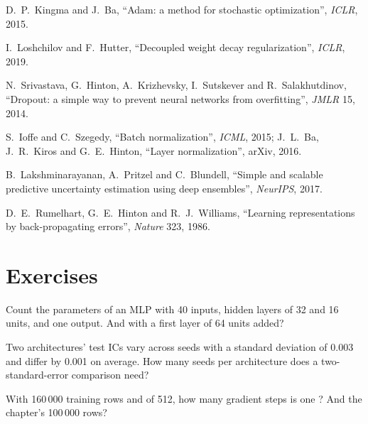 \begin{omsources}
\item D.~P.~Kingma and J.~Ba, ``Adam: a method for stochastic optimization'', \emph{ICLR}, 2015.
\item I.~Loshchilov and F.~Hutter, ``Decoupled weight decay regularization'', \emph{ICLR}, 2019.
\item N.~Srivastava, G.~Hinton, A.~Krizhevsky, I.~Sutskever and R.~Salakhutdinov, ``Dropout: a simple way to prevent
neural networks from overfitting'', \emph{JMLR} 15, 2014.
\item S.~Ioffe and C.~Szegedy, ``Batch normalization'', \emph{ICML}, 2015; J.~L.~Ba, J.~R.~Kiros and G.~E.~Hinton,
``Layer normalization'', arXiv, 2016.
\item B.~Lakshminarayanan, A.~Pritzel and C.~Blundell, ``Simple and scalable predictive uncertainty estimation using deep
ensembles'', \emph{NeurIPS}, 2017.
\item D.~E.~Rumelhart, G.~E.~Hinton and R.~J.~Williams, ``Learning representations by back-propagating errors'',
\emph{Nature} 323, 1986.
\end{omsources}

\section{Exercises}

\begin{exercise}[$\star$]\label{exo:ml:neural-networks-for-noisy-tabular-data:1}
Count the parameters of an MLP with 40 inputs, hidden layers of 32 and 16 units, and one output. And with a first layer
of 64 units added?
\end{exercise}

\begin{exercise}[$\star$]\label{exo:ml:neural-networks-for-noisy-tabular-data:2}
Two architectures' test ICs vary across seeds with a standard deviation of 0.003 and differ by 0.001 on average. How many
seeds per architecture does a two-standard-error comparison need?
\end{exercise}

\begin{exercise}[$\star$]\label{exo:ml:neural-networks-for-noisy-tabular-data:3}
With 160\,000 training rows and  of 512, how many gradient steps is one ? And the chapter's
100\,000 rows?
\end{exercise}

